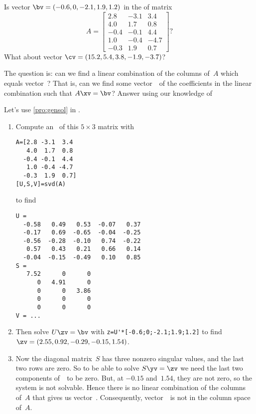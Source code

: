 \begin{example} 
Is vector \(\bv=(-0.6,0,-2.1,1.9,1.2)\) in the  of matrix
\begin{equation*}
A=\begin{bmatrix} 2.8&-3.1&3.4
\\4.0&1.7&0.8
\\-0.4&-0.1&4.4
\\1.0&-0.4&-4.7
\\-0.3&1.9&0.7 \end{bmatrix}?
\end{equation*}
What about vector \(\cv=(15.2,5.4,3.8,-1.9,-3.7)\)?

\begin{solution} 
The question is: can we find a linear combination of the columns of~\(A\) which equals vector~\bv?
That is, can we find some vector~\xv\ of the coefficients in the linear combination such that \(A\xv=\bv\)?
Answer using our knowledge of 

Let's use \cref{pro:gensol} in \script.
\begin{enumerate}
\item Compute an \svd\  of this \(5\times 3\) matrix with
\begin{verbatim}
A=[2.8 -3.1  3.4
   4.0  1.7  0.8
  -0.4 -0.1  4.4
   1.0 -0.4 -4.7
  -0.3  1.9  0.7]
[U,S,V]=svd(A)
\end{verbatim}
\setbox\ajrqrbox\hbox{}%
\marginajrbox%
to find \twodp
\begin{verbatim}
U =
  -0.58   0.49   0.53  -0.07   0.37
  -0.17   0.69  -0.65  -0.04  -0.25
  -0.56  -0.28  -0.10   0.74  -0.22
   0.57   0.43   0.21   0.66   0.14
  -0.04  -0.15  -0.49   0.10   0.85
S =
   7.52      0      0
      0   4.91      0
      0      0   3.86
      0      0      0
      0      0      0
V = ...
\end{verbatim}

\item Then solve \(U\zv=\bv\) with \verb|z=U'*[-0.6;0;-2.1;1.9;1.2]| to find \twodp\ \(\zv=(2.55,0.92,-0.29,-0.15,1.54)\).

\item Now the diagonal matrix~\(S\) has three nonzero singular values, and the last two rows are zero.
So to be able to solve \(S\yv=\zv\) we need the last two components of~\zv\ to be zero. 
But, at \(-0.15\) and~\(1.54\), they are not zero, so the system is not solvable.
Hence there is no linear combination of the columns of~\(A\) that gives us vector~\bv.
Consequently, vector~\bv\ is not in the column space of~\(A\).


\end{enumerate}
\end{solution}
\end{example}
